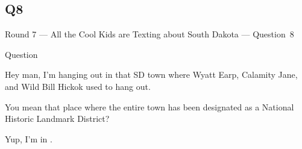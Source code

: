 \documentclass[11pt]{beamer}
\begin{document}
\subsection*{Q8}
\begin{frame}[t]{Round 7 --- All the Cool Kids are Texting about South Dakota --- \mbox{Question 8}}
\begin{block}{Question}

\begin{minipage}{0.9\textwidth}
\begin{mdframed}[
    roundcorner=7pt,
    backgroundcolor=black!5,
    linecolor=black!5,
    fontcolor=black,
    ignorelastdescenders]
\begin{flushleft}
{\small{}\selectfont{}
Hey man, I'm hanging out in that SD town where Wyatt Earp, Calamity Jane, and Wild Bill Hickok used to hang out.
}
\end{flushleft}
\end{mdframed}
\end{minipage}

\hfill{}\begin{minipage}{0.9\textwidth}
\begin{mdframed}[
    roundcorner=7pt,
    backgroundcolor=blue!80!white,
    linecolor=blue!80!white,
    fontcolor=white,
    ignorelastdescenders]
\begin{flushleft}
{\small{}\selectfont{}
You mean that place where the entire town has been designated as a National Historic Landmark District?
}
\end{flushleft}
\end{mdframed}
\end{minipage}

\begin{minipage}{0.9\textwidth}
\begin{mdframed}[
    roundcorner=7pt,
    backgroundcolor=black!5,
    linecolor=black!5,
    fontcolor=black,
    ignorelastdescenders]
\begin{flushleft}
{\small{}\selectfont{}
Yup, I'm in \textunderscore{}\textunderscore{}\textunderscore{}\textunderscore{}\textunderscore{}\textunderscore{}.
}
\end{flushleft}
\end{mdframed}
\end{minipage}
\end{block}
\end{frame}
\end{document}
